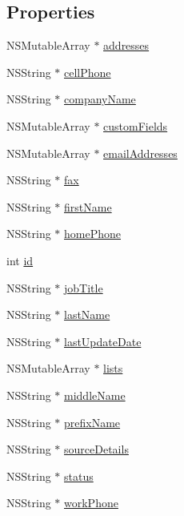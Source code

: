 \subsection*{Properties}
\begin{DoxyCompactItemize}
\item 
N\-S\-Mutable\-Array $\ast$ \hyperlink{interface_contact_a6f3056ee37a2c574a33e3902ba3474ec}{addresses}
\item 
N\-S\-String $\ast$ \hyperlink{interface_contact_aec563ebe90e8e4788ddb4f6acd78f751}{cell\-Phone}
\item 
N\-S\-String $\ast$ \hyperlink{interface_contact_a3fedaf7d7c99879b3c057e31953f2111}{company\-Name}
\item 
N\-S\-Mutable\-Array $\ast$ \hyperlink{interface_contact_afbd448e9768e6bd5aed50863552694a5}{custom\-Fields}
\item 
N\-S\-Mutable\-Array $\ast$ \hyperlink{interface_contact_a334fd74963f3c92c2699f2241bb63070}{email\-Addresses}
\item 
N\-S\-String $\ast$ \hyperlink{interface_contact_acb90e8cf0e6ff5ea93ae8c712d24eda5}{fax}
\item 
N\-S\-String $\ast$ \hyperlink{interface_contact_a8624b8683addad46447537e7646e7c7a}{first\-Name}
\item 
N\-S\-String $\ast$ \hyperlink{interface_contact_a34cf6ecd7b4a61cbf31b0b765171f397}{home\-Phone}
\item 
int \hyperlink{interface_contact_aa31847b281001bb11f2e8e50c039c3b2}{id}
\item 
N\-S\-String $\ast$ \hyperlink{interface_contact_a912410340f1d6862dc465b5390f4a91b}{job\-Title}
\item 
N\-S\-String $\ast$ \hyperlink{interface_contact_a6779c87444d59d250b3f797e6d1c666a}{last\-Name}
\item 
N\-S\-String $\ast$ \hyperlink{interface_contact_a92456883005773868e6d9e8216921a90}{last\-Update\-Date}
\item 
N\-S\-Mutable\-Array $\ast$ \hyperlink{interface_contact_a985f57955f894f6e3b9068bcbf1726c6}{lists}
\item 
N\-S\-String $\ast$ \hyperlink{interface_contact_aa42ef7503bc45638d581c61208b7f63e}{middle\-Name}
\item 
N\-S\-String $\ast$ \hyperlink{interface_contact_a5bc67629e5dc9b61ff097aeff0701076}{prefix\-Name}
\item 
N\-S\-String $\ast$ \hyperlink{interface_contact_a37a7c97391240a1586822a1c0dde5df3}{source\-Details}
\item 
N\-S\-String $\ast$ \hyperlink{interface_contact_ab26ceb12a3c4b9e3e64b69e8d945a2dd}{status}
\item 
N\-S\-String $\ast$ \hyperlink{interface_contact_a76be4721aa8c7eab59a9aad7a34d4986}{work\-Phone}
\end{DoxyCompactItemize}


